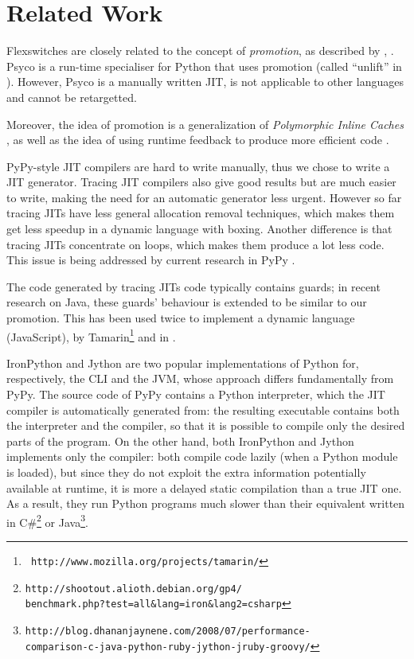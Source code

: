 \section{Related Work}

Flexswitches are closely related to the concept of \emph{promotion}, as
described by \cite{PyPyJIT}, \cite{PyPyJIT09}.
Psyco is
a run-time specialiser for Python that uses promotion (called ``unlift'' in
\cite{DBLP:conf/pepm/Rigo04}). However, Psyco is a manually written JIT, is
not applicable to other languages and cannot be retargetted.

Moreover, the idea of promotion is a generalization of \emph{Polymorphic
  Inline Caches} \cite{hoelzle_optimizing_1991}, as well as the idea of using
runtime feedback to produce more efficient code
\cite{hoelzle_type_feedback_1994}.

PyPy-style JIT compilers are hard to write manually, thus we chose to write a
JIT generator.  Tracing JIT compilers \cite{gal_hotpathvm_2006} also give
good results but are much easier to write, making the need for an automatic
generator less urgent.  However so far tracing JITs have less general
allocation removal techniques, which makes them get less speedup in a dynamic
language with boxing.  Another difference is that tracing JITs concentrate on
loops, which makes them produce a lot less code.  This issue is being addressed
by current research in PyPy \cite{PyPyTracing}.

The code generated by tracing JITs code typically contains guards; in recent research
\cite{gal_incremental_2006} on Java, these guards' behaviour is extended to be
similar to our promotion.  This has been used twice to implement a dynamic
language (JavaScript), by Tamarin\footnote{{\tt
http://www.mozilla.org/projects/tamarin/}} and in \cite{chang_efficient_2007}.

IronPython and Jython are two popular implementations of Python for,
respectively, the CLI and the JVM, whose approach differs fundamentally from
PyPy.  The source code of PyPy contains a Python interpreter, which the JIT
compiler is automatically generated from: the resulting executable contains
both the interpreter and the compiler, so that it is possible to compile only
the desired parts of the program.  On the other hand, both IronPython and
Jython implements only the compiler: both compile code lazily (when a Python
module is loaded), but since they do not exploit the extra information
potentially available at runtime, it is more a delayed static compilation than
a true JIT one.  As a result, they run Python programs much slower than their
equivalent written in
C\#\footnote{\texttt{http://shootout.alioth.debian.org/gp4/\\benchmark.php?test=all\&lang=iron\&lang2=csharp}}
or
Java\footnote{\texttt{http://blog.dhananjaynene.com/2008/07/performance-\\comparison-c-java-python-ruby-jython-jruby-groovy/}}.

